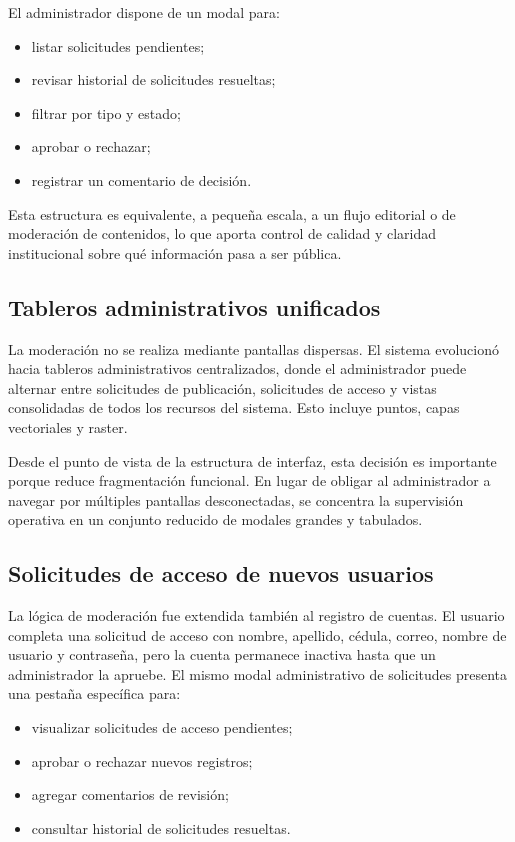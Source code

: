 \documentclass[12pt,a4paper]{report}
\begin{document}
El administrador dispone de un modal para:

\begin{itemize}
    \item listar solicitudes pendientes;
    \item revisar historial de solicitudes resueltas;
    \item filtrar por tipo y estado;
    \item aprobar o rechazar;
    \item registrar un comentario de decisi\'on.
\end{itemize}

Esta estructura es equivalente, a peque\~na escala, a un flujo editorial o de moderaci\'on de contenidos, lo que aporta control de calidad y claridad institucional sobre qu\'e informaci\'on pasa a ser p\'ublica.

\subsection{Tableros administrativos unificados}

La moderaci\'on no se realiza mediante pantallas dispersas. El sistema evolucion\'o hacia tableros administrativos centralizados, donde el administrador puede alternar entre solicitudes de publicaci\'on, solicitudes de acceso y vistas consolidadas de todos los recursos del sistema. Esto incluye puntos, capas vectoriales y raster.

Desde el punto de vista de la estructura de interfaz, esta decisi\'on es importante porque reduce fragmentaci\'on funcional. En lugar de obligar al administrador a navegar por m\'ultiples pantallas desconectadas, se concentra la supervisi\'on operativa en un conjunto reducido de modales grandes y tabulados.

\subsection{Solicitudes de acceso de nuevos usuarios}

La l\'ogica de moderaci\'on fue extendida tambi\'en al registro de cuentas. El usuario completa una solicitud de acceso con nombre, apellido, c\'edula, correo, nombre de usuario y contrase\~na, pero la cuenta permanece inactiva hasta que un administrador la apruebe. El mismo modal administrativo de solicitudes presenta una pesta\~na espec\'ifica para:

\begin{itemize}
    \item visualizar solicitudes de acceso pendientes;
    \item aprobar o rechazar nuevos registros;
    \item agregar comentarios de revisi\'on;
    \item consultar historial de solicitudes resueltas.
\end{itemize}
\end{document}
